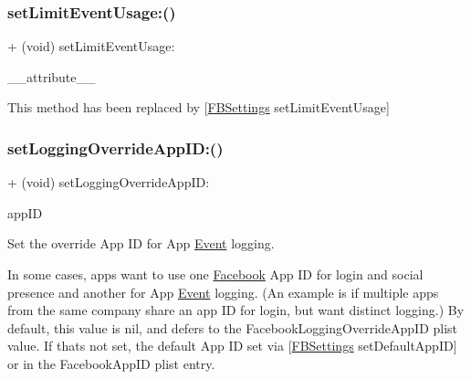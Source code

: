 \subsubsection{\texorpdfstring{set\+Limit\+Event\+Usage\+:()}{setLimitEventUsage:()}\hspace{0.1cm}{\footnotesize\ttfamily [5/5]}}
{\footnotesize\ttfamily + (void) set\+Limit\+Event\+Usage\+: \begin{DoxyParamCaption}\item[{((deprecated(\char`\"{}use \mbox{[}\hyperlink{interfaceFBSettings}{F\+B\+Settings} set\+Limit\+Event\+And\+Data\+Usage\mbox{]} instead\char`\"{})))}]{\+\_\+\+\_\+attribute\+\_\+\+\_\+ }\end{DoxyParamCaption}}

This method has been replaced by \mbox{[}\hyperlink{interfaceFBSettings}{F\+B\+Settings} set\+Limit\+Event\+Usage\mbox{]} \mbox{\label{interfaceFBAppEvents_a3f9d06a1e8b3d482efc5c438827fbc6e}} 
\subsubsection{\texorpdfstring{set\+Logging\+Override\+App\+I\+D\+:()}{setLoggingOverrideAppID:()}\hspace{0.1cm}{\footnotesize\ttfamily [1/5]}}
{\footnotesize\ttfamily + (void) set\+Logging\+Override\+App\+I\+D\+: \begin{DoxyParamCaption}\item[{(N\+S\+String $\ast$)}]{app\+ID }\end{DoxyParamCaption}}

Set the \textquotesingle{}override\textquotesingle{} App ID for App \hyperlink{classEvent}{Event} logging.

In some cases, apps want to use one \hyperlink{interfaceFacebook}{Facebook} App ID for login and social presence and another for App \hyperlink{classEvent}{Event} logging. (An example is if multiple apps from the same company share an app ID for login, but want distinct logging.) By default, this value is {\ttfamily nil}, and defers to the {\ttfamily Facebook\+Logging\+Override\+App\+ID} plist value. If that\textquotesingle{}s not set, the default App ID set via \mbox{[}\hyperlink{interfaceFBSettings}{F\+B\+Settings} set\+Default\+App\+ID\mbox{]} or in the {\ttfamily Facebook\+App\+ID} plist entry.

